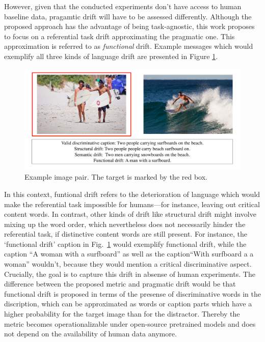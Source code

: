 However, given that the conducted experiments don't have access to human baseline data, pragamtic drift will have to be assessed differently. Although the proposed approach has the advantage of being task-agnostic, this work proposes to focus on a referential task drift approximating the pragmatic one. This approximation is referred to as \textit{functional} drift. Example messages which would exemplify all three kinds of language drift are presented in Figure \ref{fig:coco_drift_example}.

\begin{figure}[h]
	\centering
	\includegraphics[width=0.9\linewidth]{images/COCO_drift_example_cropped.pdf}
	\caption{Example image pair. The target is marked by the red box.}
	\label{fig:coco_drift_example}
\end{figure}

In this context, funtional drift refers to the deterioration of language which would make the referential task impossible for humans---for instance, leaving out critical content words. 
In contrast, other kinds of drift like structural drift might involve mixing up the word order, which nevertheless does not necessarily hinder the referential task, if distinctive content words are still present. For instance, the `functional drift' caption in Fig.~\ref{fig:coco_drift_example} would exemplify functional drift, while the caption ``A woman with a surfboard'' as well as the caption``With surfboard a a woman'' wouldn't, because they would mention a critical discriminative aspect. 
Crucially, the goal is to capture this drift in absense of human experiments. The difference between the proposed metric and pragmatic drift would be that functional drift is proposed in terms of the presense of discriminative words in the discription, which can be approximated as words or caption parts which have a higher probability for the target image than for the distractor. Thereby the metric becomes operationalizable under open-source pretrained models and does not depend on the availability of human data anymore. 

